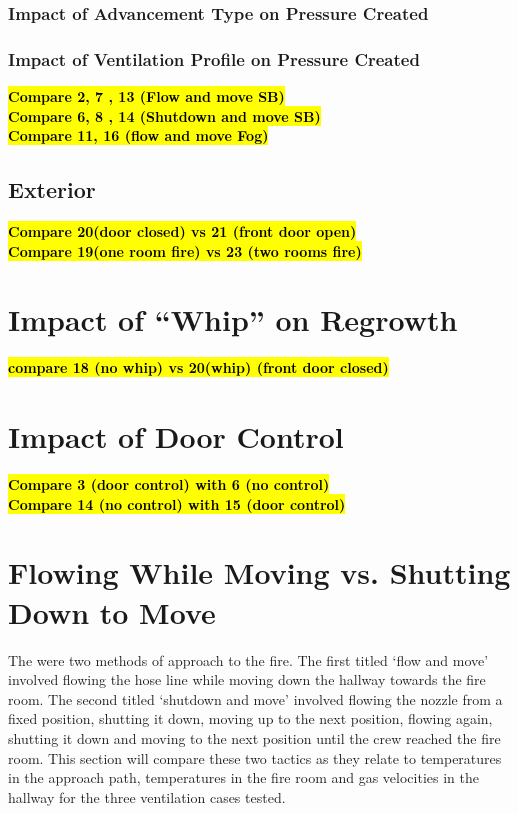 \documentclass[12pt,oneside]{book}
\begin{document}
	\subsubsection{Impact of Advancement Type on Pressure Created}

	\subsubsection{Impact of Ventilation Profile on Pressure Created}
	\textbf{\hl{Compare 2, 7 , 13 (Flow and move SB)}} \\
	\textbf{\hl{Compare 6, 8 , 14 (Shutdown and move SB)}} \\
	\textbf{\hl{Compare 11, 16 (flow and move Fog)}} \\

\subsection{Exterior}
\textbf{\hl{Compare 20(door closed) vs 21 (front door open)}} \\
\textbf{\hl{Compare 19(one room fire) vs 23 (two rooms fire)}} \\

\section{Impact of ``Whip'' on Regrowth}
\textbf{\hl{compare 18 (no whip) vs 20(whip) (front door closed)}} \\

\section{Impact of Door Control}
\textbf{\hl{Compare 3 (door control) with 6 (no control)}} \\
\textbf{\hl{Compare 14 (no control) with 15 (door control)}} \\

\normalfont

\section{Flowing While Moving vs. Shutting Down to Move}
The were two methods of approach to the fire. The first titled `flow and move' involved flowing the hose line while moving down the hallway towards the fire room. The second titled `shutdown and move' involved flowing the nozzle from a fixed position, shutting it down, moving up to the next position, flowing again, shutting it down and moving to the next position until the crew reached the fire room. This section will compare these two tactics as they relate to temperatures in the approach path, temperatures in the fire room and gas velocities in the hallway for the three ventilation cases tested. 
\end{document}
